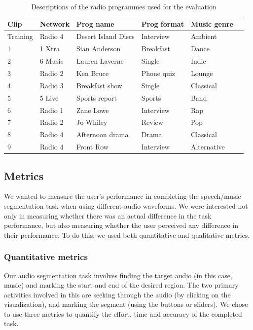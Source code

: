 \begin{table}[htbp]
  \begin{center}
    {\small
    \begin{tabular}{l l l l l l}
      \hline
      \textbf{Clip} & \textbf{Network} & \textbf{Prog name} & \textbf{Prog format} & \textbf{Music genre} \\ \hline
      Training & Radio 4 & Desert Island Discs & Interview & Ambient \\
      1 & 1 Xtra & Sian Anderson & Breakfast & Dance \\
      2 & 6 Music & Lauren Laverne & Single & Indie \\
      3 & Radio 2 & Ken Bruce & Phone quiz & Lounge \\
      4 & Radio 3 & Breakfast show & Single & Classical \\
      5 & 5 Live & Sports report & Sports & Band \\
      6 & Radio 1 & Zane Lowe & Interview & Rap \\
      7 & Radio 2 & Jo Whiley & Review & Pop \\
      8 & Radio 4 & Afternoon drama & Drama & Classical \\
      9 & Radio 4 & Front Row & Interview & Alternative \\ \hline
    \end{tabular}
  }
  \end{center}
  \caption{Descriptions of the radio programmes used for the evaluation}
  \label{tab:clips}
\end{table}

\subsection{Metrics}

We wanted to measure the user's performance in completing the speech/music segmentation task when using different audio
waveforms. We were interested not only in measuring whether there was an actual difference in the task performance, but
also measuring whether the user perceived any difference in their performance.  To do this, we used both quantitative
and qualitative metrics.

\subsubsection{Quantitative metrics}
Our audio segmentation task involves finding the target audio (in this case, music) and marking the start and end of
the desired region. The two primary activities involved in this are seeking through the audio (by clicking on the
visualization), and marking the segment (using the buttons or sliders).  We chose to use three metrics to quantify the
effort, time and accuracy of the completed task.

